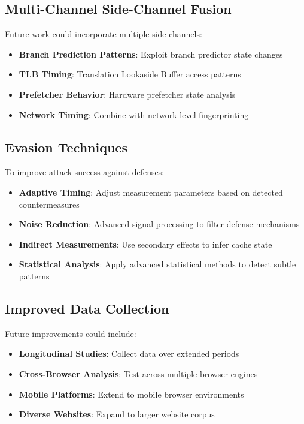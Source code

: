 \documentclass[11pt,a4paper]{article}
\begin{document}
\subsection{Multi-Channel Side-Channel Fusion}
Future work could incorporate multiple side-channels:
\begin{itemize}
    \item \textbf{Branch Prediction Patterns}: Exploit branch predictor state changes
    \item \textbf{TLB Timing}: Translation Lookaside Buffer access patterns
    \item \textbf{Prefetcher Behavior}: Hardware prefetcher state analysis
    \item \textbf{Network Timing}: Combine with network-level fingerprinting
\end{itemize}

\subsection{Evasion Techniques}
To improve attack success against defenses:
\begin{itemize}
    \item \textbf{Adaptive Timing}: Adjust measurement parameters based on detected countermeasures
    \item \textbf{Noise Reduction}: Advanced signal processing to filter defense mechanisms
    \item \textbf{Indirect Measurements}: Use secondary effects to infer cache state
    \item \textbf{Statistical Analysis}: Apply advanced statistical methods to detect subtle patterns
\end{itemize}

\subsection{Improved Data Collection}
Future improvements could include:
\begin{itemize}
    \item \textbf{Longitudinal Studies}: Collect data over extended periods
    \item \textbf{Cross-Browser Analysis}: Test across multiple browser engines
    \item \textbf{Mobile Platforms}: Extend to mobile browser environments
    \item \textbf{Diverse Websites}: Expand to larger website corpus
\end{itemize}
\end{document}
